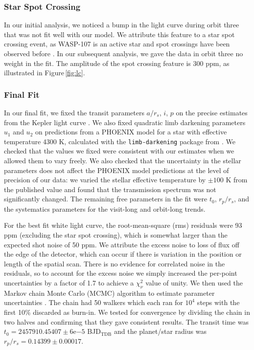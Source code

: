\documentclass[twocolumn, trackchanges]{aastex61}
\begin{document}
\subsubsection{Star Spot Crossing}
In our initial analysis, we noticed a bump in the light curve during orbit three that was not fit well with our model. We attribute this feature to a star spot crossing event, as WASP-107 is an active star and spot crossings have been observed before \citep{dai17, mocnik17}. In our subsequent analysis, we gave the data in orbit three no weight in the fit. The amplitude of the spot crossing feature is 300 ppm, as illustrated in Figure\,\ref{fig:lc}.

\subsubsection{Final Fit}
In our final fit, we fixed the transit parameters $a/r_s$, $i$, $p$ on the precise estimates from the Kepler light curve \citep{dai17}.  We also fixed quadratic limb darkening parameters $u_1$ and $u_2$ on predictions from a PHOENIX model for a star with effective temperature 4300 K, calculated with the \texttt{limb-darkening} package from \cite{espinoza15}.  We checked that the values we fixed were consistent with our estimates when we allowed them to vary freely.  We also checked that the uncertainty in the stellar parameters does not affect the PHOENIX model predictions at the level of precision of our data: we varied the stellar effective temperature by $\pm100$ K from the published value and found that the transmission spectrum was not significantly changed.  The remaining free parameters in the fit were $t_0$, $r_p/r_s$, and the systematics parameters for the visit-long and orbit-long trends.

For the best fit white light curve, the root-mean-square (rms) residuals were 93 ppm (excluding the star spot crossing), which is somewhat larger than the expected shot noise of 50 ppm. We attribute the excess noise to loss of flux off the edge of the detector, which can occur if there is variation in the position or length of the spatial scan. There is no evidence for correlated noise in the residuals, so to account for the excess noise we simply increased the per-point uncertainties by a factor of 1.7 to achieve a $\chi^2_\nu$ value of unity.  We then used the Markov chain Monte Carlo (MCMC) algorithm to estimate parameter uncertainties \citep{foremanmackey13}.  The chain had 50 walkers which each ran for $10^4$ steps with the first 10\% discarded as burn-in. We tested for convergence by dividing the chain in two halves and confirming that they gave consistent results. The transit time was $t_0 = 2457910.45407\pm6\mathrm{e}{-5}$ BJD$_\mathrm{TDB}$ and the planet/star radius was $r_p/r_s = 0.14399\pm0.00017$. 
\end{document}
